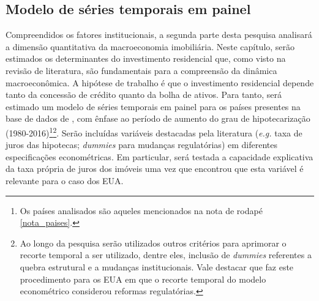 \subsection{Modelo de séries temporais em painel}\label{metodologia2}

Compreendidos os fatores institucionais, a segunda parte desta pesquisa analisará a dimensão quantitativa da macroeconomia imobiliária.
Neste capítulo, serão estimados os determinantes do investimento residencial que, como visto na revisão de literatura, são fundamentais para a compreensão da dinâmica macroeconômica.
A hipótese de trabalho é que o investimento residencial depende tanto da concessão de crédito quanto da bolha de ativos.
Para tanto, será estimado um modelo de séries temporais em  painel para os países presentes na base de dados de \textcite{jorda_rate_2019}, com ênfase ao período de aumento do grau de hipotecarização (1980-2016)\footnote{Os países analisados são aqueles mencionados na nota de rodapé \ref{nota_paises}.}\footnote{Ao longo da pesquisa serão utilizados outros critérios para aprimorar o recorte temporal a ser utilizado, dentre eles, inclusão de \textit{dummies} referentes a quebra estrutural e a mudanças institucionais. Vale destacar que \textcite{petrini_demanda_2019} faz este procedimento para os EUA em que o recorte temporal do modelo econométrico considerou reformas regulatórias.}.
Serão incluídas variáveis destacadas pela literatura (\textit{e.g.} taxa de juros das hipotecas; \textit{dummies} para mudanças regulatórias) em diferentes especificações econométricas.
 Em particular, será testada a capacidade explicativa  da taxa própria de juros dos imóveis uma vez que \textcite{petrini_demanda_2019} encontrou que esta variável é relevante para o caso dos EUA.


